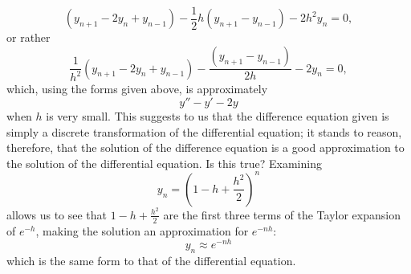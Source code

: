 \documentclass{article}
\begin{document}
\begin{equation*}
    (y_{n+1}-2y_n + y_{n-1}) - \frac{1}{2}h(y_{n+1}-y_{n-1}) - 2h^2 y_n = 0,
\end{equation*}
or rather
\begin{equation*}
    \frac{1}{h^2}(y_{n+1}-2y_n + y_{n-1}) - \frac{(y_{n+1}-y_{n-1})}{2h} - 2y_n = 0,
\end{equation*}
which, using the forms given above, is approximately
\begin{equation*}
    y'' - y' -2y
\end{equation*}
when $h$ is very small. This suggests to us that the difference equation given is simply a discrete transformation of the differential equation; it stands to reason, therefore, that the solution of the difference equation is a good approximation to the solution of the differential equation. Is this true? Examining
\begin{equation*}
    y_n = (1-h+\frac{h^2}{2})^n
\end{equation*}
allows us to see that $1-h+\frac{h^2}{2}$ are the first three terms of the Taylor expansion of $e^{-h}$, making the solution an approximation for $e^{-nh}$:
\begin{equation*}
    y_n \approx e^{-nh}
\end{equation*} 
which is the same form to that of the differential equation.

\hrulefill
\end{document}
